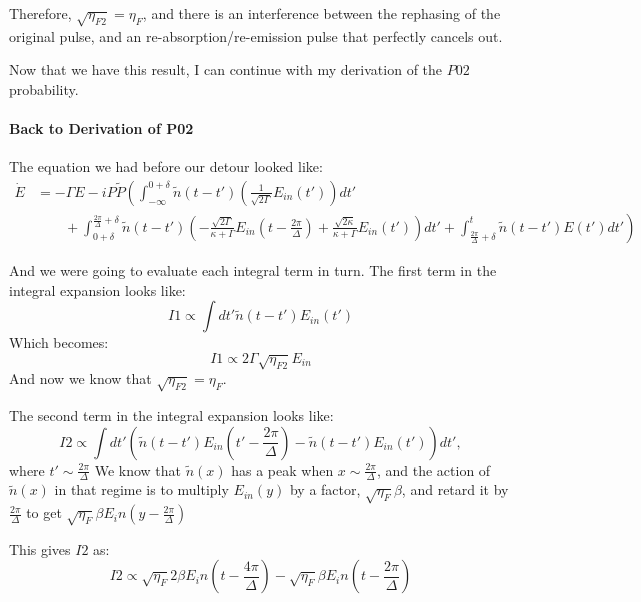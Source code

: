 \documentclass[12pt]{article}
\begin{document}
Therefore, $\sqrt{\eta_{F2}} = \eta_F$, and there is an interference between the rephasing of the original pulse, and an re-absorption/re-emission pulse that perfectly cancels out.

Now that we have this result, I can continue with my derivation of the $P02$ probability.
\paragraph{Back to Derivation of P02}
The equation we had before our detour looked like:
\begin{align}
\label{eq:afcp02s3}
\dot{E} &= -\Gamma E  -i P \tilde{P}\left( \int_{-\infty}^{0+\delta}\tilde{n}(t-t')\left( \frac{1}{\sqrt{2 \Gamma}} E_{in}(t')\right)dt' \right. \\
&\left. \qquad+\int^{\frac{2 \pi}{\Delta}+\delta}_{0+\delta} \tilde{n}(t-t') \left(- \frac{\sqrt{2 \Gamma}}{\kappa +\Gamma} E_{in}(t-\frac{2 \pi}{\Delta}) +\frac{\sqrt{2 \kappa}}{\kappa+\Gamma} E_{in}(t')\right)dt'
+ \int^t_{\frac{2 \pi}{\Delta}+\delta} \tilde{n}(t-t') E(t') dt'\right)
\end{align}

And we were going to evaluate each integral term in turn. The first term in the integral expansion looks like:
\begin{equation}
I1 \propto \int dt' \tilde{n}(t-t')E_{in}(t')
\end{equation}
Which becomes:
\begin{equation}
I1 \propto 2 \Gamma \sqrt{\eta_{F2}} E_{in}
\end{equation}
And now we know that $\sqrt{\eta_{F2}}=\eta_{F}$.

The second term in the integral expansion looks like:
\begin{equation}
I2 \propto \int dt' \left( \tilde{n}(t-t')E_{in}(t'-\frac{2 \pi}{\Delta}) - \tilde{n}(t-t')E_{in}(t') \right) dt',
\end{equation}
where $t'\sim \frac{2 \pi}{\Delta}$
We know that $\tilde{n}(x)$ has a peak when $x \sim \frac{2 \pi}{\Delta}$, and the action of $\tilde{n}(x)$ in that regime is to multiply $E_{in}(y)$ by a factor, $\sqrt{\eta_F}\beta$, and retard it by $\frac{2 \pi}{\Delta}$ to get $\sqrt{\eta_F}\beta E_in(y-\frac{2 \pi}{\Delta})$

This gives $I2$ as:
\begin{equation}
I2 \propto \sqrt{\eta_F}2 \beta E_in( t - \frac{4 \pi}{\Delta}) -\sqrt{\eta_F} \beta E_in( t - \frac{2 \pi}{\Delta})
\end{equation}
\end{document}
